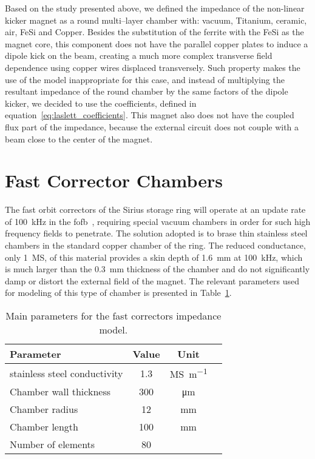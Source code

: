     Based on the study presented above, we defined the impedance of the non-linear kicker magnet as a round multi--layer chamber with: vacuum, Titanium, ceramic, air, FeSi and Copper. Besides the substitution of the ferrite with the FeSi as the magnet core, this component does not have the parallel copper plates to induce a dipole kick on the beam, creating a much more complex transverse field dependence using copper wires displaced transversely.  Such property makes the use of the  model inappropriate for this case, and instead of multiplying the resultant impedance of the round chamber by the same factors of the dipole kicker, we decided to use the  coefficients, defined in equation~\eqref{eq:laslett_coefficients}. This magnet also does not have the coupled flux part of the impedance, because the external circuit does not couple with a beam close to the center of the magnet.

\section{Fast Corrector Chambers}

    The fast orbit correctors of the Sirius storage ring will operate at an update rate of \SI{100}{\kilo\hertz} in the \gls{fofb}~\cite{Tavares2013}, requiring special vacuum chambers in order for such high frequency fields to penetrate. The solution adopted is to brase thin stainless steel chambers in the standard copper chamber of the ring. The reduced conductance, only \SI{1}{\mega\siemens}, of this material provides a skin depth of \SI{1.6}{\milli\meter} at \SI{100}{\kilo\hertz}, which is much larger than the \SI{0.3}{\milli\meter} thickness of the chamber and do not significantly damp or distort the external field of the magnet. The relevant parameters used for modeling of this type of chamber is presented in Table~\ref{tab:fast_correctors_chamber_parameters}.
    \begin{table}
        \centering
        \caption{Main parameters for the fast correctors impedance model.}
        \label{tab:fast_correctors_chamber_parameters}
        \begin{tabular}{lccc}
            \toprule
            Parameter            & Value      & Unit \\
            \midrule
            stainless steel conductivity      & 1.3  & \si{\mega\siemens\per\meter}\\
            Chamber wall thickness & 300  & \si{\micro\meter}\\
            Chamber radius       & 12   & \si{\milli\meter}\\
            Chamber length       & 100  & \si{\milli\meter}\\
            Number of elements   &  80  & \\
            \bottomrule
        \end{tabular}
    \end{table}

